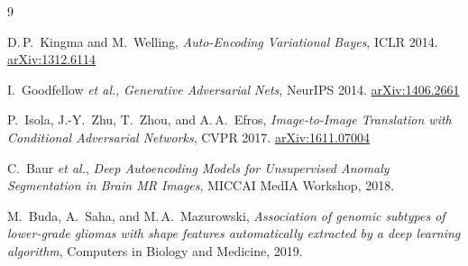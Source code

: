 \documentclass[12pt,a4paper]{article}
\begin{document}
\begin{thebibliography}{9}

D.\,P.\ Kingma and M.\ Welling,
\textit{Auto-Encoding Variational Bayes},
ICLR 2014. \href{https://arxiv.org/abs/1312.6114}{arXiv:1312.6114}

I.\ Goodfellow \emph{et al.},
\textit{Generative Adversarial Nets},
NeurIPS 2014. \href{https://arxiv.org/abs/1406.2661}{arXiv:1406.2661}

P.\ Isola, J.-Y.\ Zhu, T.\ Zhou, and A.\,A.\ Efros,
\textit{Image-to-Image Translation with Conditional Adversarial Networks},
CVPR 2017. \href{https://arxiv.org/abs/1611.07004}{arXiv:1611.07004}

C.\ Baur \emph{et al.},
\textit{Deep Autoencoding Models for Unsupervised Anomaly Segmentation in Brain MR Images},
MICCAI MedIA Workshop, 2018.

M.\ Buda, A.\ Saha, and M.\,A.\ Mazurowski,
\textit{Association of genomic subtypes of lower-grade gliomas with shape features
automatically extracted by a deep learning algorithm},
Computers in Biology and Medicine, 2019.

\end{thebibliography}
\end{document}
